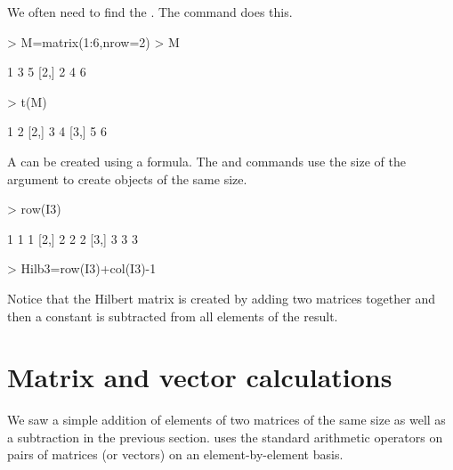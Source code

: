 We often need to find the . The  command does this. 
\begin{Schunk}
\begin{Sinput}
> M=matrix(1:6,nrow=2) 
> M 
\end{Sinput}
\begin{Soutput}
     [,1] [,2] [,3]
[1,]    1    3    5
[2,]    2    4    6
\end{Soutput}
\begin{Sinput}
> t(M) 
\end{Sinput}
\begin{Soutput}
     [,1] [,2]
[1,]    1    2
[2,]    3    4
[3,]    5    6
\end{Soutput}
\end{Schunk}
 
A  can be created using a formula. The  and  commands use the size of the argument to create objects of the same size. 
\begin{Schunk}
\begin{Sinput}
> row(I3) 
\end{Sinput}
\begin{Soutput}
     [,1] [,2] [,3]
[1,]    1    1    1
[2,]    2    2    2
[3,]    3    3    3
\end{Soutput}
\begin{Sinput}
> Hilb3=row(I3)+col(I3)-1 
\end{Sinput}
\end{Schunk}
Notice that the Hilbert matrix is created by adding two matrices together and then a constant is subtracted from all elements of the result. 
 
\section{Matrix and vector calculations} 
 
We saw a simple addition of elements of two matrices of the same size as well as a subtraction in the previous section. \R{} uses the standard arithmetic operators on pairs of matrices (or vectors) on an element-by-element basis.  
 
